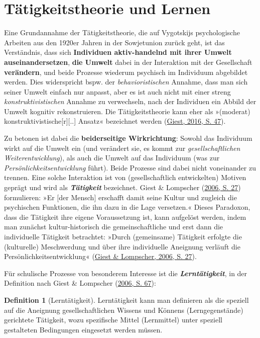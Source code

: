 \documentclass[
]{scrbook}
\theoremstyle{definition}
\newtheorem{definition}{Definition}[chapter]
\theoremstyle{definition}
\theoremstyle{definition}
\theoremstyle{definition}
\theoremstyle{remark}
\begin{document}
\hypertarget{taetigkeitstheorie-und-lernen}{%
\section{Tätigkeitstheorie und Lernen}\label{taetigkeitstheorie-und-lernen}}

Eine Grundannahme der Tätigkeitstheorie, die auf Vygotskijs psychologische Arbeiten aus den 1920er Jahren in der Sowjetunion zurück geht, ist das Verständnis, dass sich \textbf{Individuen aktiv-handelnd mit ihrer Umwelt auseinandersetzen}, \textbf{die Umwelt} dabei in der Interaktion mit der Gesellschaft \textbf{verändern}, und beide Prozesse wiederum psychisch im Individuum abgebildet werden. Dies widerspricht bspw. der \emph{behavioristischen} Annahme, dass man sich seiner Umwelt einfach nur anpasst, aber es ist auch nicht mit einer streng \emph{konstruktivistischen} Annahme zu verwechseln, nach der Individuen ein Abbild der Umwelt kognitiv rekonstruieren. Die Tätigkeitstheorie kann eher als »(moderat) konstruktivistische{[}r{]}{[}..{]} Ansatz« bezeichnet werden (\protect\hyperlink{ref-Giest2016a}{Giest, 2016, S. 47}).

Zu betonen ist dabei die \textbf{beiderseitige Wirkrichtung}: Sowohl das Individuum wirkt auf die Umwelt ein (und verändert sie, es kommt zur \emph{gesellschaftlichen Weiterentwicklung}), als auch die Umwelt auf das Individuum (was zur \emph{Persönlichkeitsentwicklung} führt). Beide Prozesse sind dabei nicht voneinander zu trennen. Eine solche Interaktion ist von (gesellschaftlich entwickelten) Motiven geprägt und wird als \textbf{\emph{Tätigkeit}} bezeichnet. Giest \& Lompscher (\protect\hyperlink{ref-Giest2006}{2006, S. 27}) formulieren: »Er {[}der Mensch{]} erschafft damit seine Kultur und zugleich die psychischen Funktionen, die ihn dazu in die Lage versetzen.« Dieses Paradoxon, dass die Tätigkeit ihre eigene Voraussetzung ist, kann aufgelöst werden, indem man zunächst kultur-historisch die gemeinschaftliche und erst dann die individuelle Tätigkeit betrachtet: »Durch (gemeinsame) Tätigkeit erfolgte die (kulturelle) Meschwerdung und über ihre individuelle Aneignung verläuft die Persönlichkeitsentwicklung« (\protect\hyperlink{ref-Giest2006}{Giest \& Lompscher, 2006, S. 27}).

Für schulische Prozesse von besonderem Interesse ist die \textbf{\emph{Lerntätigkeit}}, in der Definition nach Giest \& Lompscher (\protect\hyperlink{ref-Giest2006}{2006, S. 67}):

\begin{definition}[Lerntätigkeit]
\protect\hypertarget{def:Lerntaetigkeit}{}\label{def:Lerntaetigkeit}Lerntätigkeit kann man definieren als die speziell auf die Aneignung gesellschaftlichen Wissens und Könnens (Lerngegenstände) gerichtete Tätigkeit, wozu spezifische Mittel (Lernmittel) unter speziell gestalteten Bedingungen eingesetzt werden müssen.
\end{definition}
\end{document}

